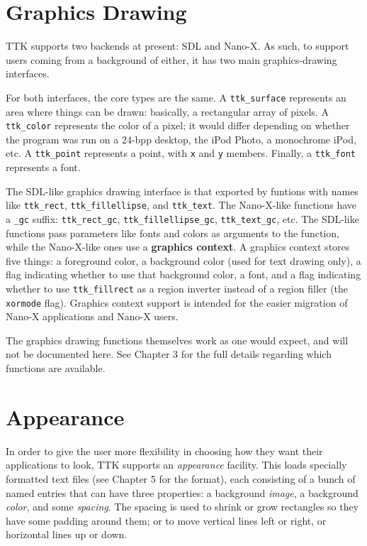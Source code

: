 \documentclass[12pt,letterpaper]{report}
\begin{document}
\section{Graphics Drawing}
TTK supports two backends at present: SDL and Nano-X. As such, to support users coming from a background
of either, it has two main graphics-drawing interfaces.

For both interfaces, the core types are the same. A \verb|ttk_surface| represents an area where things
can be drawn: basically, a rectangular array of pixels. A \verb|ttk_color| represents the
color of a pixel; it would differ depending on whether the program was run on a 24-bpp desktop, the iPod
Photo, a monochrome iPod, etc. A \verb|ttk_point| represents a point, with \verb|x| and \verb|y| members.
Finally, a \verb|ttk_font| represents a font.

The SDL-like graphics drawing interface is that exported by funtions with names like \verb|ttk_rect|,
\verb|ttk_fillellipse|, and \verb|ttk_text|. The Nano-X-like functions have a \verb|_gc| suffix:
\verb|ttk_rect_gc|, \verb|ttk_fillellipse_gc|, \verb|ttk_text_gc|, etc. The SDL-like functions
pass parameters like fonts and colors as arguments to the function, while the Nano-X-like ones
use a {\bf graphics context}. A graphics context stores five things: a foreground color, a background color
(used for text drawing only), a flag indicating whether to use that background color, a font,
and a flag indicating whether to use \verb|ttk_fillrect| as a region inverter instead of a region filler
(the \verb|xormode| flag). Graphics context support is intended for the easier migration of Nano-X
applications and Nano-X users.

The graphics drawing functions themselves work as one would expect, and will not be documented here.
See Chapter 3 for the full details regarding which functions are available.

\section{Appearance}
In order to give the user more flexibility in choosing how they want their applications to look,
TTK supports an {\sl appearance} facility. This loads specially formatted text files (see Chapter 5 for
the format), each consisting of a bunch of named entries that can have three properties: a background
{\sl image}, a background {\sl color}, and some {\sl spacing}. The spacing is used to shrink or
grow rectangles so they have some padding around them; or to move vertical lines left or right, or horizontal
lines up or down.
\end{document}
